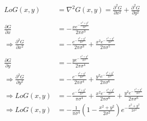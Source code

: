 \documentclass[11pt]{article}
\begin{document}
\begin{align*}
LoG(x,y) &= \nabla^2G(x,y) = \frac{\partial^2 G}{\partial x^2} + \frac{\partial^2 G}{\partial y^2}\\
&\\
\frac{\partial G}{\partial x}&=- \frac{x e^{-\frac{ x^{2} + y^2}{2 \sigma^{2}}}}{2 \pi \sigma^{3}} \\
\Rightarrow \frac{\partial^2 G}{\partial x^2}&=- \frac{e^{-\frac{ x^{2} + y^2}{2 \sigma^{2}}}}{2 \pi \sigma^{3}} + \frac{x^{2} e^{-\frac{ x^{2} + y^2}{2 \sigma^{2}}}}{2 \pi \sigma^{5}} \\
& \\
\frac{\partial G}{\partial y}&=-\frac{y e^{-\frac{ x^{2} + y^2}{2 \sigma^{2}}}}{2 \pi \sigma^{4}}\\
\Rightarrow \frac{\partial^2 G}{\partial y^2}&=-\frac{e^{-\frac{ x^{2} + y^2}{2 \sigma^{2}}}}{2 \pi \sigma^{4}} + \frac{y^{2} e^{-\frac{ x^{2} + y^2}{2 \sigma^{2}}}}{2 \pi \sigma^{6}}
& \\
\Rightarrow LoG(x,y) &=- \frac{e^{-\frac{ x^{2} + y^2}{2 \sigma^{2}}}}{\pi \sigma^{4}} + \frac{x^{2} e^{-\frac{ x^{2} + y^2}{2 \sigma^{2}}}}{2 \pi \sigma^{6}} + \frac{y^{2} e^{-\frac{ x^{2} + y^2}{2 \sigma^{2}}}}{2 \pi \sigma^{6}}\\
\Rightarrow LoG(x,y) &=-\frac{1}{\pi\sigma^4}\left(1-\frac{x^2+y^2}{2\sigma^2}\right)e^{-\frac{x^2+y^2}{2\sigma^{2}}}
\end{align*}
\end{document}
